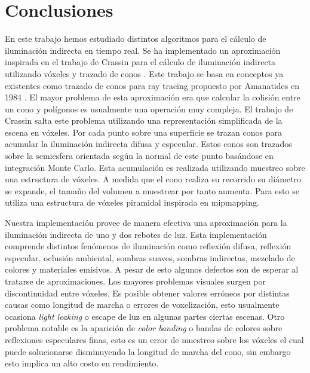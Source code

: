 \chapter{Conclusiones}
\label{chap:conclusion}
En este trabajo hemos estudiado distintos algoritmos para el cálculo de iluminación indirecta en tiempo real. Se ha implementado un aproximación inspirada en el trabajo de Crassin para el cálculo de iluminación indirecta utilizando vóxeles y trazado de conos \cite{CNSGE11b}. Este trabajo se basa en conceptos ya existentes como trazado de conos para ray tracing propuesto por Amanatides en 1984 \cite{Amanatides:1984:RTC:800031.808589}. El mayor problema de esta aproximación era que calcular la colisión entre un cono y polígonos es usualmente una operación muy compleja. El trabajo de Crassin salta este problema utilizando una representación simplificada de la escena en vóxeles. Por cada punto sobre una superficie se trazan conos para acumular la iluminación indirecta difusa y especular. Estos conos son trazados sobre la semiesfera orientada según la normal de este punto basándose en integración Monte Carlo. Esta acumulación es realizada utilizando muestreo sobre una estructura de vóxeles. A medida que el cono realiza su recorrido su diámetro se expande, el tamaño del volumen a muestrear por tanto aumenta. Para esto se utiliza una estructura de vóxeles piramidal inspirada en mipmapping.

Nuestra implementación provee de manera efectiva una aproximación para la iluminación indirecta de uno y dos rebotes de luz. Esta implementación comprende distintos fenómenos de iluminación como reflexión difusa, reflexión especular, oclusión ambiental, sombras suaves, sombras indirectas, mezclado de colores y materiales emisivos. A pesar de esto algunos defectos son de esperar al tratarse de aproximaciones. Los mayores problemas visuales surgen por discontinuidad entre vóxeles. Es posible obtener valores erróneos por distintas causas como longitud de marcha o errores de voxelización, esto usualmente ocasiona \emph{light leaking} o escape de luz en algunas partes ciertas escenas. Otro problema notable es la aparición de \emph{color banding} o bandas de colores sobre reflexiones especulares finas, esto es un error de muestreo sobre los vóxeles el cual puede solucionarse disminuyendo la longitud de marcha del cono, sin embargo esto implica un alto costo en rendimiento.

